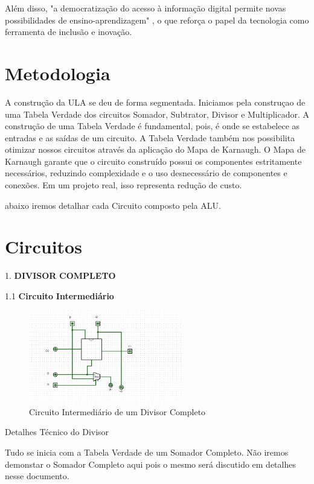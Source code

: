 \documentclass[
12pt,
openright,
oneside,
a4paper,
chapter=TITLE,
english,
brazil,
colorlinks=true,
linkcolor=blue,
citecolor=blue,
filecolor=magenta,
urlcolor=blue
]{abntex2}
\begin{document}
	Além disso, "a democratização do acesso à informação digital permite novas possibilidades de ensino-aprendizagem" , o que reforça o papel da tecnologia como ferramenta de inclusão e inovação.
	
	\chapter{Metodologia}
  A construção da ULA se deu de forma segmentada. Iniciamos pela construçao de uma Tabela Verdade dos circuitos Somador, Subtrator, Divisor e Multiplicador. A construção de uma Tabela Verdade é fundamental, pois, é onde se estabelece as entradas e as saídas de um circuito. A Tabela Verdade também nos possibilita otimizar nossos circuitos através da aplicação do Mapa de Karnaugh.
    O Mapa de Karnaugh garante que o circuito construído possui os componentes estritamente necessários, reduzindo complexidade e o uso desnecessário de componentes e conexões. Em um projeto real, isso representa redução de custo.

    abaixo iremos detalhar cada Circuito composto pela ALU.

  \chapter{Circuitos}

    1. \textbf{DIVISOR} \textbf{COMPLETO}

    1.1 \textbf{Circuito} \textbf{Intermediário}

     \begin{figure}[H]
		\centering
		\includegraphics[width=0.6\textwidth]{Divisor_Estagio_Intermediario.png}
		\caption{Circuito Intermediário de um Divisor Completo}
		\label{fig:exemplo}
	\end{figure}

	Detalhes Técnico do Divisor
	
	Tudo se inicia com a Tabela Verdade de um Somador Completo. Não iremos demonstar o Somador Completo aqui pois o mesmo será discutido em detalhes nesse documento.
	
\end{document}
